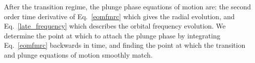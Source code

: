 
After the transition regime, the plunge phase equations of motion are:  the second order time  derivative of Eq.~\eqref{eomfmrc} which gives the radial evolution, and Eq.~\eqref{late_frequency} which describes the orbital frequency evolution. We determine the point at which to attach the plunge phase by integrating  Eq.~\eqref{eomfmrc} backwards in time, and finding the point at which the transition and plunge equations of motion smoothly match. 


